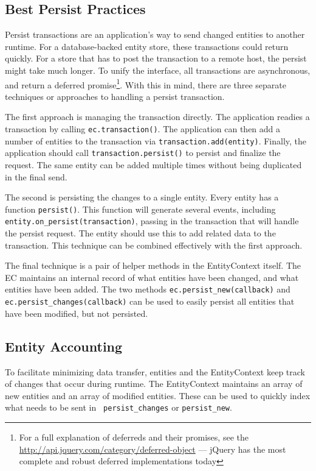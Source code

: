 \documentclass{article}
\newcommand{\ilcode}{\tt}
\begin{document}
\subsection{Best Persist Practices}
Persist transactions are an application's way to send changed entities to
another runtime. For a database-backed entity store, these transactions could
return quickly. For a store that has to post the transaction to a remote host,
the persist might take much longer. To unify the interface, all transactions are
asynchronous, and return a deferred promise\footnote{For a full explanation of
deferreds and their promises, see the \hyperref[jQuery documentation]
{http://api.jquery.com/category/deferred-object} --- jQuery has the
most complete and robust deferred implementations today}. With this in mind, there are three
separate techniques or approaches to handling a persist transaction.

The first approach is managing the transaction directly. The application
readies a transaction by calling {\ilcode ec.transaction()}. The
application can then add a number of entities to the
transaction via {\ilcode transaction.add(entity)}. Finally, the application
should call {\ilcode transaction.persist()} to persist and finalize the request.
The same entity can be added multiple times without being duplicated in the
final send.

The second is persisting the changes to a single entity. Every entity has a
function {\ilcode persist()}. This function will generate several events, including
{\ilcode entity.on\_persist(transaction)}, passing in the transaction that will
handle the persist request. The entity should use this to add related data to
the transaction. This technique can be combined effectively with the first
approach.

The final technique is a pair of helper methods in the EntityContext itself. The
EC maintains an internal record of what entities have been changed, and what
entities have been added. The two methods {\ilcode ec.persist\_new(callback)}
and {\ilcode ec.persist\_changes(callback)} can be used to easily persist all
entities that have been modified, but not persisted.

\subsection{Entity Accounting}

To facilitate minimizing data transfer, entities
and the EntityContext keep track of changes that occur during runtime. The
EntityContext maintains an array of new entities and an array of modified
entities. These can be used to quickly index what needs to be sent in {\ilcode
persist\_changes} or {\ilcode persist\_new}.
\end{document}
